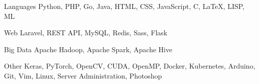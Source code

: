 

\begin{cvskills}

  \cvskill
    {Languages} %
    {Python, PHP, Go, Java, HTML, CSS, JavaScript, C, \LaTeX, LISP, ML} %

  \cvskill
    {Web} %
    {Laravel, REST API, MySQL, Redis, Sass, Flask} %

  \cvskill
    {Big Data} %
    {Apache Hadoop, Apache Spark, Apache Hive} %

  \cvskill
    {Other} %
    {Keras, PyTorch, OpenCV, CUDA, OpenMP, Docker, Kubernetes, Arduino, Git, Vim, Linux, Server Administration, Photoshop} %

\end{cvskills}

